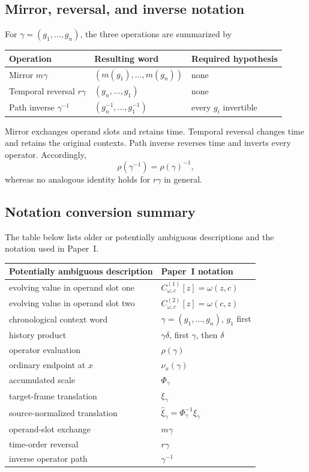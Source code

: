 \subsection{Mirror, reversal, and inverse notation}

For $\gamma=(g_1,\ldots,g_n)$, the three operations are summarized by
\begin{center}
\begin{tabular}{lll}
\toprule
Operation & Resulting word & Required hypothesis \\
\midrule
Mirror $m\gamma$
& $(m(g_1),\ldots,m(g_n))$
& none \\
Temporal reversal $r\gamma$
& $(g_n,\ldots,g_1)$
& none \\
Path inverse $\gamma^{-1}$
& $(g_n^{-1},\ldots,g_1^{-1})$
& every $g_i$ invertible \\
\bottomrule
\end{tabular}
\end{center}
Mirror exchanges operand slots and retains time.  Temporal reversal changes
time and retains the original contexts.  Path inverse reverses time and
inverts every operator.  Accordingly,
\[
  \rho(\gamma^{-1})=\rho(\gamma)^{-1},
\]
whereas no analogous identity holds for $r\gamma$ in general.

\subsection{Notation conversion summary}

The table below lists older or potentially ambiguous descriptions and the
notation used in Paper~I.

\begin{center}
\renewcommand{\arraystretch}{1.25}
\begin{tabular}{ll}
\toprule
Potentially ambiguous description & Paper~I notation \\
\midrule
evolving value in operand slot one
& $C_{\omega,c}^{(1)}[z]=\omega(z,c)$ \\
evolving value in operand slot two
& $C_{\omega,c}^{(2)}[z]=\omega(c,z)$ \\
chronological context word
& $\gamma=(g_1,\ldots,g_n)$, $g_1$ first \\
history product
& $\gamma\delta$, first $\gamma$, then $\delta$ \\
operator evaluation
& $\rho(\gamma)$ \\
ordinary endpoint at $x$
& $\nu_x(\gamma)$ \\
accumulated scale
& $\Phi_\gamma$ \\
target-frame translation
& $\xi_\gamma$ \\
source-normalized translation
& $\widehat\xi_\gamma=\Phi_\gamma^{-1}\xi_\gamma$ \\
operand-slot exchange
& $m\gamma$ \\
time-order reversal
& $r\gamma$ \\
inverse operator path
& $\gamma^{-1}$ \\
\bottomrule
\end{tabular}
\end{center}
